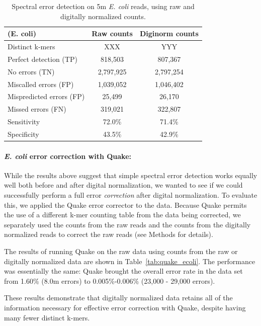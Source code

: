 \documentclass{article}
\begin{document}
\begin{table}
\begin{tabular}{|l|c|c|}
\hline
(E. coli) & Raw counts & Diginorm counts \\
\hline
Distinct k-mers & XXX & YYY \\
\hline
Perfect detection (TP) & 818,503 & 807,367 \\
No errors (TN) & 2,797,925 & 2,797,254 \\
Miscalled errors (FP) & 1,039,052 & 1,046,402 \\
Mispredicted errors (FP) & 25,499 & 26,170 \\
Missed errors (FN) & 319,021 & 322,807 \\
\hline
Sensitivity & 72.0\% & 71.4\% \\
Specificity & 43.5\% & 42.9\% \\
\hline
\end{tabular}
\label{tab:ecoli_dn_counts}

\caption{Spectral error detection on 5m {\em E. coli} reads, using raw and
  digitally normalized counts.}
\end{table}


\paragraph{{\em E. coli} error correction with Quake:}

While the results above suggest that simple spectral error detection
works equally well both before and after digital normalization, we
wanted to see if we could successfully perform a full error {\em
  correction} after digital normalization.  To evaluate this, we applied
the Quake error corrector to the data.  Because Quake permits the use
of a different k-mer counting table from the data being corrected,
we separately used the counts from the raw reads and the counts from
the digitally normalized reads to correct the raw reads (see Methods
for details).

The results of running Quake on the raw data using counts from the raw
or digitally normalized data are shown in Table~\ref{tab:quake_ecoli}.
The performance was essentially the same: Quake brought the overall
error rate in the data set from 1.60\% (8.0m errors) to
0.005\%-0.006\% (23,000 - 29,000 errors).

These results demonstrate that digitally normalized data retains all
of the information necessary for effective error correction with
Quake, despite having many fewer distinct k-mers.
\end{document}

